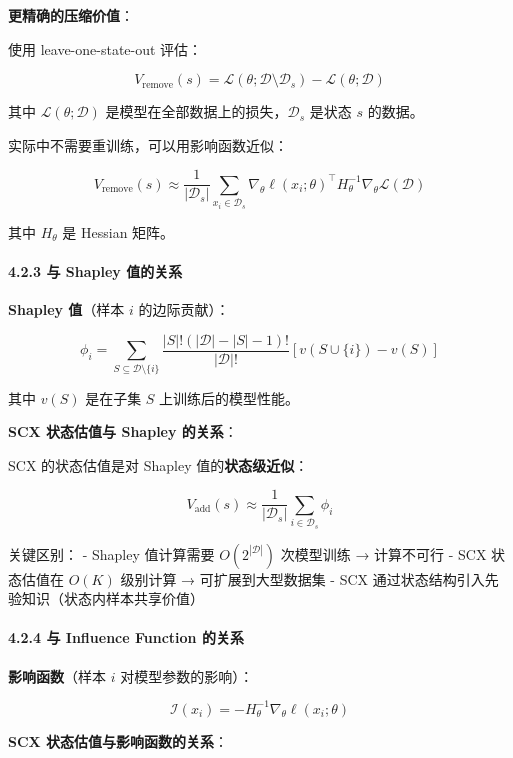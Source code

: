 \documentclass[
  12pt,
]{ctexart}
\begin{document}
\textbf{更精确的压缩价值}：

使用 leave-one-state-out 评估：

\[
V_{\text{remove}}(s) = \mathcal{L}(\theta; \mathcal{D} \setminus \mathcal{D}_s) - \mathcal{L}(\theta; \mathcal{D})
\]

其中 \(\mathcal{L}(\theta; \mathcal{D})\)
是模型在全部数据上的损失，\(\mathcal{D}_s\) 是状态 \(s\) 的数据。

实际中不需要重训练，可以用影响函数近似：

\[
V_{\text{remove}}(s) \approx \frac{1}{|\mathcal{D}_s|} \sum_{x_i \in \mathcal{D}_s} \nabla_\theta \ell(x_i; \theta)^\top H_\theta^{-1} \nabla_\theta \mathcal{L}(\mathcal{D})
\]

其中 \(H_\theta\) 是 Hessian 矩阵。

\paragraph{4.2.3 与 Shapley
值的关系}\label{ux4e0e-shapley-ux503cux7684ux5173ux7cfb}

\textbf{Shapley 值}（样本 \(i\) 的边际贡献）：

\[
\phi_i = \sum_{S \subseteq \mathcal{D} \setminus \{i\}} \frac{|S|!(|\mathcal{D}| - |S| - 1)!}{|\mathcal{D}|!} [v(S \cup \{i\}) - v(S)]
\]

其中 \(v(S)\) 是在子集 \(S\) 上训练后的模型性能。

\textbf{SCX 状态估值与 Shapley 的关系}：

SCX 的状态估值是对 Shapley 值的\textbf{状态级近似}：

\[
V_{\text{add}}(s) \approx \frac{1}{|\mathcal{D}_s|} \sum_{i \in \mathcal{D}_s} \phi_i
\]

关键区别： - Shapley 值计算需要 \(O(2^{|\mathcal{D}|})\) 次模型训练 →
计算不可行 - SCX 状态估值在 \(O(K)\) 级别计算 → 可扩展到大型数据集 - SCX
通过状态结构引入先验知识（状态内样本共享价值）

\paragraph{4.2.4 与 Influence Function
的关系}\label{ux4e0e-influence-function-ux7684ux5173ux7cfb}

\textbf{影响函数}（样本 \(i\) 对模型参数的影响）：

\[
\mathcal{I}(x_i) = -H_\theta^{-1} \nabla_\theta \ell(x_i; \theta)
\]

\textbf{SCX 状态估值与影响函数的关系}：
\end{document}
